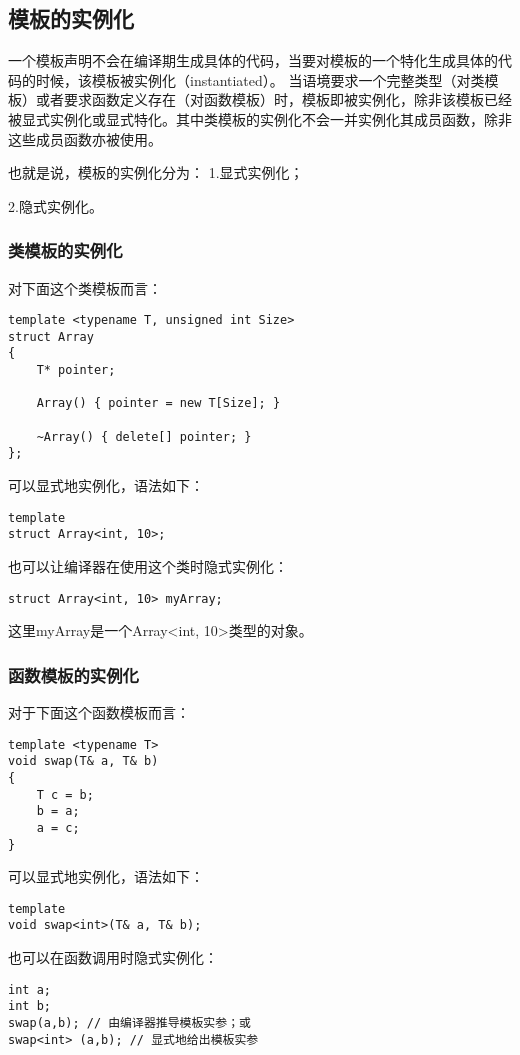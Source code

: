 \documentclass[UTF8]{ctexart}
\begin{document}
\subsection{模板的实例化}
一个模板声明不会在编译期生成具体的代码，当要对模板的一个特化生成具体的代码的时候，该模板被实例化（instantiated）。 当语境要求一个完整类型（对类模板）或者要求函数定义存在（对函数模板）时，模板即被实例化，除非该模板已经被显式实例化或显式特化。其中类模板的实例化不会一并实例化其成员函数，除非这些成员函数亦被使用。

也就是说，模板的实例化分为：
1.显式实例化；

2.隐式实例化。
\subsubsection{类模板的实例化}
对下面这个类模板而言：
\begin{lstlisting}
template <typename T, unsigned int Size>
struct Array
{
    T* pointer;

    Array() { pointer = new T[Size]; } 
    
    ~Array() { delete[] pointer; }
};
\end{lstlisting}

可以显式地实例化，语法如下：
\begin{lstlisting}
template 
struct Array<int, 10>;
\end{lstlisting}

也可以让编译器在使用这个类时隐式实例化：
\begin{lstlisting}
struct Array<int, 10> myArray;
\end{lstlisting}

这里myArray是一个Array<int, 10>类型的对象。
\subsubsection{函数模板的实例化}
对于下面这个函数模板而言：
\begin{lstlisting}
template <typename T>
void swap(T& a, T& b) 
{
    T c = b;
    b = a;
    a = c;
}
\end{lstlisting}

可以显式地实例化，语法如下：
\begin{lstlisting}
template 
void swap<int>(T& a, T& b);
\end{lstlisting}

也可以在函数调用时隐式实例化：
\begin{lstlisting}
int a;
int b;
swap(a,b); // 由编译器推导模板实参；或
swap<int> (a,b); // 显式地给出模板实参
\end{lstlisting}
\end{document}
